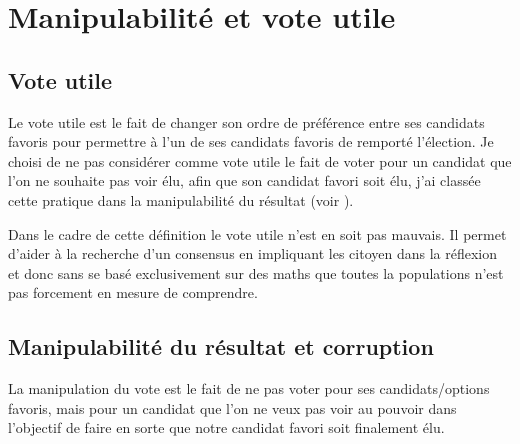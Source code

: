 \documentclass[../report]{subfiles}
\begin{document}
  \section{Manipulabilité et vote utile}

  \subsection{Vote utile}%
  \label{diff:comp:util:util}

  Le vote utile est le fait de changer son ordre de préférence entre ses candidats favoris pour
  permettre à l'un de ses candidats favoris de remporté l'élection. 
  Je choisi de ne pas considérer comme vote utile le fait de voter pour un candidat que l'on ne
  souhaite pas voir élu, afin que son candidat favori soit élu, j'ai classée cette pratique 
  dans la manipulabilité du résultat (voir ).

  Dans le cadre de cette définition le vote utile n'est en soit pas mauvais.
  Il permet d'aider à la recherche d'un consensus en impliquant les citoyen dans la réflexion
  et donc sans se basé exclusivement sur des maths que toutes la populations n'est pas forcement
  en mesure de comprendre.



  \subsection{Manipulabilité du résultat et corruption}%
  \label{diff:comp:util:manip}%
  \label{diff:comp:util:corruption}

  La manipulation du vote est le fait de ne pas voter pour ses candidats/options favoris, mais 
  pour un candidat que l'on ne veux pas voir au pouvoir dans l'objectif de faire en sorte que 
  notre candidat favori soit finalement élu.
\end{document}
